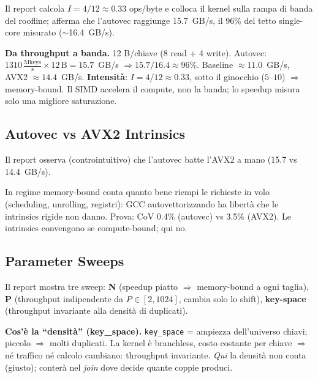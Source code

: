 \documentclass[11pt,a4paper]{article}
\begin{document}
Il report calcola $I=4/12\approx0.33$ ops/byte e colloca il kernel sulla rampa di banda del roofline; afferma che l'autovec raggiunge 15.7~GB/s, il 96\% del tetto single-core misurato ($\sim$16.4~GB/s).

\begin{deriv}
\textbf{Da throughput a banda.} 12 B/chiave (8 read + 4 write). Autovec: $1310\,\tfrac{\text{Mkeys}}{\text{s}}\times12\,\text{B}=15.7$~GB/s $\Rightarrow15.7/16.4\approx96\%$. Baseline $\approx11.0$~GB/s, AVX2 $\approx14.4$~GB/s. \textbf{Intensità}: $I=4/12\approx0.33$, sotto il ginocchio ($5$--$10$) $\Rightarrow$ memory-bound. Il SIMD accelera il compute, non la banda; lo speedup misura solo una migliore saturazione.
\end{deriv}

\subsection{Autovec vs AVX2 Intrinsics}

Il report osserva (controintuitivo) che l'autovec batte l'AVX2 a mano (15.7 vs 14.4~GB/s).

\begin{difesa}
In regime memory-bound conta quanto bene riempi le richieste in volo (scheduling, unrolling, registri): GCC autovettorizzando ha libertà che le intrinsics rigide non danno. Prova: CoV 0.4\% (autovec) vs 3.5\% (AVX2). Le intrinsics convengono se compute-bound; qui no.
\end{difesa}

\subsection{Parameter Sweeps}

Il report mostra tre sweep: \textbf{N} (speedup piatto $\Rightarrow$ memory-bound a ogni taglia), \textbf{P} (throughput indipendente da $P\in[2,1024]$, cambia solo lo shift), \textbf{key-space} (throughput invariante alla densità di duplicati).

\begin{deriv}
\textbf{Cos'è la ``densità'' (key\_space).} \texttt{key\_space} = ampiezza dell'universo chiavi; piccolo $\Rightarrow$ molti duplicati. La kernel è branchless, costo costante per chiave $\Rightarrow$ né traffico né calcolo cambiano: throughput invariante. \emph{Qui} la densità non conta (giusto); conterà nel \emph{join} dove decide quante coppie produci.
\end{deriv}
\end{document}
